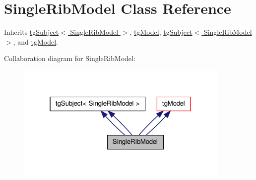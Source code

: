 \hypertarget{class_single_rib_model}{\section{Single\-Rib\-Model Class Reference}
\label{class_single_rib_model}
}


Inherits \hyperlink{classtg_subject}{tg\-Subject$<$ Single\-Rib\-Model $>$}, \hyperlink{classtg_model}{tg\-Model}, \hyperlink{classtg_subject}{tg\-Subject$<$ Single\-Rib\-Model $>$}, and \hyperlink{classtg_model}{tg\-Model}.



Collaboration diagram for Single\-Rib\-Model\-:\nopagebreak
\begin{figure}[H]
\begin{center}
\leavevmode
\includegraphics[width=292pt]{class_single_rib_model__coll__graph}
\end{center}
\end{figure}
